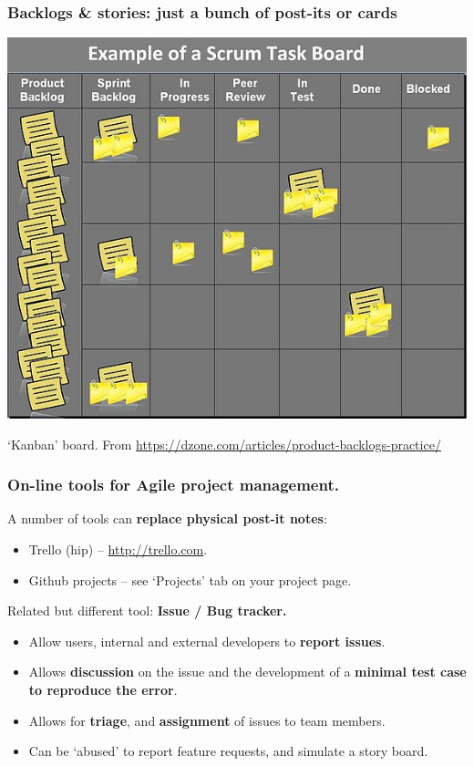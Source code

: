 \documentclass{beamer} %
\newcommand\emc[1]{\textcolor{midred}{\textbf{#1}}}
\begin{document}
\begin{frame}

\frametitle{Backlogs \& stories: just a bunch of post-its or cards}

\begin{center}
\includegraphics[scale=0.50]{assets/backlog} 
\end{center}


`Kanban' board. From \url{https://dzone.com/articles/product-backlogs-practice/}

\end{frame}


\begin{frame}

\frametitle{On-line tools for Agile project management.}

A number of tools can \emc{replace physical post-it notes}:
\begin{itemize}
  \item Trello (hip) -- \url{http://trello.com}.
  \item Github projects -- see `Projects' tab on your project page.
\end{itemize}

\vspace{5mm}
Related but different tool: \emc{Issue / Bug tracker.}
\begin{itemize}
  \item Allow users, internal and external developers to \emc{report issues}.
  \item Allows \emc{discussion} on the issue and the development of a \emc{minimal test case to reproduce the error}.
  \item Allows for \emc{triage}, and \emc{assignment} of issues to team members.
  \item Can be `abused' to report feature requests, and simulate a story board.
  \end{itemize}

\end{frame}
\end{document}
